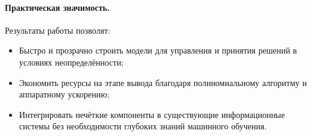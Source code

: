 \paragraph{Практическая значимость.} 

Результаты работы позволят:
\begin{itemize}
  \item Быстро и прозрачно строить модели для управления и принятия решений в условиях неопределённости;
  \item Экономить ресурсы на этапе вывода благодаря полиномиальному алгоритму и аппаратному ускорению;
  \item Интегрировать нечёткие компоненты в существующие информационные системы без необходимости глубоких знаний машинного обучения.
\end{itemize}

